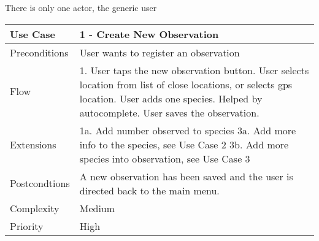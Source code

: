 There is only one actor, the generic user

\begin{tabular}[t]{|l|p{}|}\hline
Use Case&1 - Create New Observation\\\hline
Preconditions&User wants to register an observation\\\hline
Flow&1. User taps the new observation button\newline
2. User selects location from list of close locations, or selects gps location\newline
3. User adds one species. Helped by autocomplete\newline
4. User saves the observation.\\\hline
Extensions& 1a. Add number observed to species\newline
3a. Add more info to the species, see Use Case 2\newline
3b. Add more species into observation, see Use Case 3\\\hline
Postcondtions&A new observation has been saved and the user is directed back to the main menu.\\\hline
Complexity&Medium\\\hline
Priority&High\\\hline
\end{tabular}

\hspace{2em}

